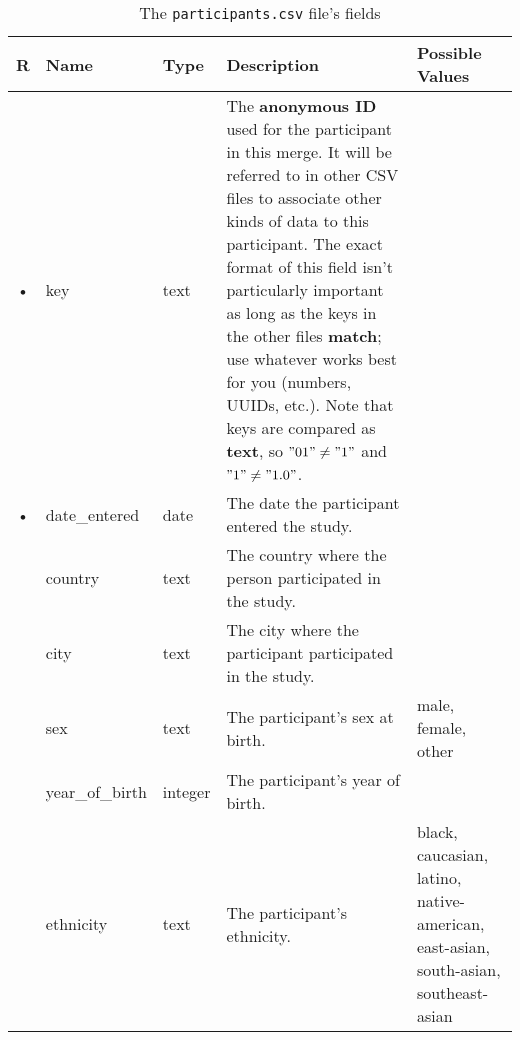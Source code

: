 \documentclass{article}
\begin{document}
\begin{table}
  \centering
  \caption{The \texttt{participants.csv} file's fields}
  \label{tbl:participants.csv}
  \begin{tabular}{cllp{6cm}p{4cm}}
    R & Name            & Type      & Description & Possible Values\\ \hline
    • & key             & text    &
      The \textbf{anonymous ID} used for the participant in this
      merge. It will be referred to in other CSV files to associate
      other kinds of data to this participant. The exact format of
      this field isn't particularly important as long as the keys in
      the other files \textbf{match}; use whatever works best for you
      (numbers, UUIDs, etc.). Note that keys are compared as
      \textbf{text}, so $"01" \neq "1"$ and $"1" \neq "1.0"$. 
      \\
    • & date\_entered   & date      & The date the participant entered the study. \\
      & country         & text    & The country where the person participated in the study. \\
      & city            & text    & The city where the participant participated in the study. \\
      & sex             & text    & The participant's sex at birth.  & male, female, other \\
      & year\_of\_birth & integer   & The participant's year of birth. \\
      & ethnicity       & text    & The participant's ethnicity. & black, caucasian, latino, native-american, east-asian, south-asian, southeast-asian \\
  \end{tabular}
\end{table}
\end{document}
